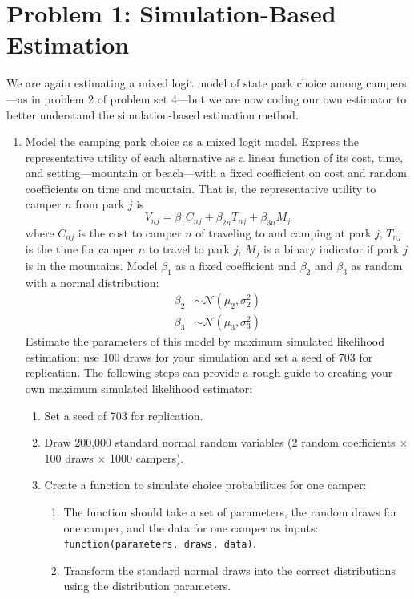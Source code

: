 \documentclass[11pt,letterpaper]{article}\usepackage[]{graphicx}\usepackage[]{xcolor}
\begin{document}
\section*{Problem 1: Simulation-Based Estimation}

We are again estimating a mixed logit model of state park choice among campers---as in problem 2 of problem set 4---but we are now coding our own estimator to better understand the simulation-based estimation method.

\begin{enumerate}[label=\alph*., leftmargin=*]
	\item Model the camping park choice as a mixed logit model. Express the representative utility of each alternative as a linear function of its cost, time, and setting---mountain or beach---with a fixed coefficient on cost and random coefficients on time and mountain. That is, the representative utility to camper $n$ from park $j$ is
	$$V_{nj} = \beta_1 C_{nj} + \beta_{2n} T_{nj} + \beta_{3n} M_j$$
	where $C_{nj}$ is the cost to camper $n$ of traveling to and camping at park $j$, $T_{nj}$ is the time for camper $n$ to travel to park $j$, $M_j$ is a binary indicator if park $j$ is in the mountains. Model $\beta_1$ as a fixed coefficient and $\beta_2$ and $\beta_3$ as random with a normal distribution:
	\begin{align*}
		\beta_2 & \sim \mathcal{N}(\mu_2, \sigma_2^2) \\
		\beta_3 & \sim \mathcal{N}(\mu_3, \sigma_3^2)
	\end{align*}
	Estimate the parameters of this model by maximum simulated likelihood estimation; use 100 draws for your simulation and set a seed of 703 for replication. The following steps can provide a rough guide to creating your own maximum simulated likelihood estimator:
	\begin{enumerate}[label=\Roman*.]
		\item Set a seed of 703 for replication.
		\item Draw 200,000 standard normal random variables (2 random coefficients $\times$ 100 draws $\times$ 1000 campers).
		\item Create a function to simulate choice probabilities for one camper:
		\begin{enumerate}[label=\roman*.]
			\item The function should take a set of parameters, the random draws for one camper, and the data for one camper as inputs: \texttt{function(parameters, draws, data)}.
			\item Transform the standard normal draws into the correct distributions using the distribution parameters.

\end{enumerate}
\end{enumerate}
\end{enumerate}
\end{document}
